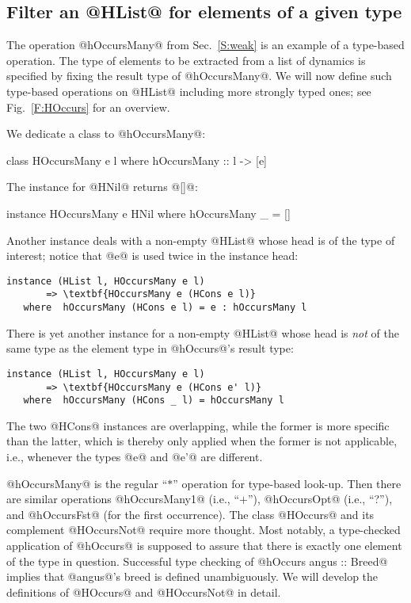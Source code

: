 \documentclass[nocopyrightspace,preprint]{sigplan-proc}
\begin{document}
\medskip

\subsection*{Filter an @HList@ for elements of a given type}

The operation @hOccursMany@ from Sec.~\ref{S:weak} is an example of a
type-based operation. The type of elements to be extracted from a list
of dynamics is specified by fixing the result type of
@hOccursMany@. We will now define such type-based operations on
@HList@ including more strongly typed ones; see Fig.~\ref{F:HOccurs}
for an overview.

We dedicate a class to @hOccursMany@:

\begin{code}
 class HOccursMany e l where hOccursMany :: l -> [e]
\end{code}

The instance for @HNil@ returns @[]@:

\begin{code}
 instance HOccursMany e HNil where hOccursMany _ = []
\end{code}

Another instance deals with a non-empty @HList@ whose head is of the
type of interest; notice that @e@ is used twice in the instance head:

\begin{Verbatim}[commandchars=\\\{\}]
 instance (HList l, HOccursMany e l)
       => \textbf{HOccursMany e (HCons e l)}
   where  hOccursMany (HCons e l) = e : hOccursMany l
\end{Verbatim}

There is yet another instance for a non-empty @HList@ whose head is
\emph{not} of the same type as the element type in @hOccurs@'s result
type:

\begin{Verbatim}[commandchars=\\\{\}]
 instance (HList l, HOccursMany e l)
       => \textbf{HOccursMany e (HCons e' l)}
   where  hOccursMany (HCons _ l) = hOccursMany l
\end{Verbatim}

The two @HCons@ instances are overlapping, while the former is more
specific than the latter, which is thereby only applied when the
former is not applicable, i.e., whenever the types @e@ and @e'@ are
different.

@hOccursMany@ is the regular ``$*$'' operation for type-based
look-up. Then there are similar operations @hOccursMany1@ (i.e.,
``$+$''), @hOccursOpt@ (i.e., ``?''), and @hOccursFst@ (for the first
occurrence). The class @HOccurs@ and its complement @HOccursNot@
require more thought. Most notably, a type-checked application of
@hOccurs@ is supposed to assure that there is exactly one element of
the type in question. Successful type checking of
%
@hOccurs angus :: Breed@ implies that @angus@'s breed is defined
unambiguously. We will develop the definitions of @HOccurs@ and
@HOccursNot@ in detail.
\end{document}
